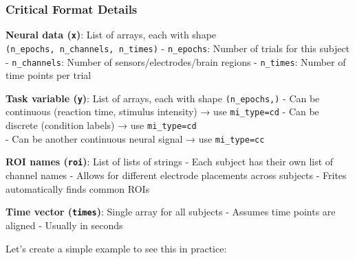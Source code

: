 \documentclass[
  11pt,
  letterpaper,
  oneside,
  openany]{book}
\begin{document}
\subsubsection{Critical Format Details}\label{critical-format-details}

\textbf{Neural data (\texttt{x})}: List of arrays, each with shape
\texttt{(n\_epochs,\ n\_channels,\ n\_times)} - \texttt{n\_epochs}:
Number of trials for this subject - \texttt{n\_channels}: Number of
sensors/electrodes/brain regions - \texttt{n\_times}: Number of time
points per trial

\textbf{Task variable (\texttt{y})}: List of arrays, each with shape
\texttt{(n\_epochs,)} - Can be continuous (reaction time, stimulus
intensity) → use
\texttt{mi\_type=\textquotesingle{}cd\textquotesingle{}} - Can be
discrete (condition labels) → use
\texttt{mi\_type=\textquotesingle{}cd\textquotesingle{}}\\
- Can be another continuous neural signal → use
\texttt{mi\_type=\textquotesingle{}cc\textquotesingle{}}

\textbf{ROI names (\texttt{roi})}: List of lists of strings - Each
subject has their own list of channel names - Allows for different
electrode placements across subjects - Frites automatically finds common
ROIs

\textbf{Time vector (\texttt{times})}: Single array for all subjects -
Assumes time points are aligned - Usually in seconds

Let's create a simple example to see this in practice:
\end{document}
